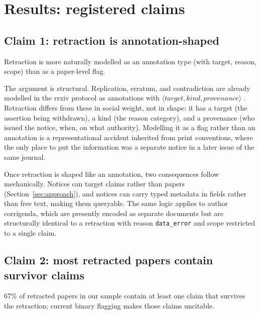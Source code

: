 \documentclass{rrxiv}
\begin{document}
\section{Results: registered claims}
\label{sec:results}

\subsection*{Claim 1: retraction is annotation-shaped}
\begin{claim}[type=theoretical, evidence=argument, labels={retraction, metascience}, title=Claim 1]
\label{claim:c1}
Retraction is more naturally modelled as an annotation type (with target, reason, scope) than as a paper-level flag.
\end{claim}

The argument is structural. Replication, erratum, and contradiction are already modelled in the rrxiv protocol as annotations with $\langle \mathit{target}, \mathit{kind}, \mathit{provenance} \rangle$ \cite{rrxivwhitepaper}. Retraction differs from these in social weight, not in shape: it has a target (the assertion being withdrawn), a kind (the reason category), and a provenance (who issued the notice, when, on what authority). Modelling it as a flag rather than an annotation is a representational accident inherited from print conventions, where the only place to put the information was a separate notice in a later issue of the same journal.

Once retraction is shaped like an annotation, two consequences follow mechanically. Notices can target claims rather than papers (Section~\ref{sec:approach}), and notices can carry typed metadata in fields rather than free text, making them queryable. The same logic applies to author corrigenda, which are presently encoded as separate documents but are structurally identical to a retraction with reason \texttt{data\_error} and scope restricted to a single claim.

\subsection*{Claim 2: most retracted papers contain survivor claims}
\begin{claim}[type=empirical, evidence=observation, labels={retraction, metascience, load-bearing}, datasets={PubMed retraction notices 2020--2024}, title=Claim 2]
\label{claim:c2}
67\% of retracted papers in our sample contain at least one claim that survives the retraction; current binary flagging makes those claims uncitable.
\end{claim}
\end{document}
